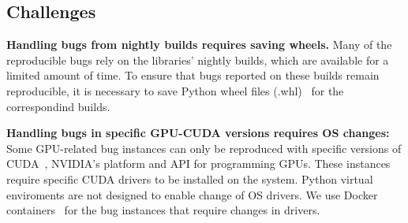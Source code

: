 \documentclass[sigconf,screen]{acmart}
\begin{document}
\vspace{-1ex}
\subsection{Challenges}
\label{sec:challenges}

\textbf{Handling bugs from nightly builds requires saving wheels.}
Many of the reproducible bugs rely on the libraries' nightly builds,
which are available for a limited amount of time. To ensure that bugs
reported on these builds remain reproducible, it is necessary to save
Python wheel files (.whl)~\cite{wheels} for the correspondind builds.

\vspace{0.5ex}\noindent\textbf{Handling bugs in specific GPU-CUDA
  versions requires OS changes:} Some GPU-related bug instances can
only be reproduced with specific versions of CUDA~\cite{cuda},
NVIDIA's platform and API for programming GPUs. These instances
require specific CUDA drivers to be installed on the system. Python
virtual enviroments are not designed to enable change of OS drivers.
We use Docker containers~\cite{merkel2014docker} for the bug instances
that require changes in drivers.
\end{document}
